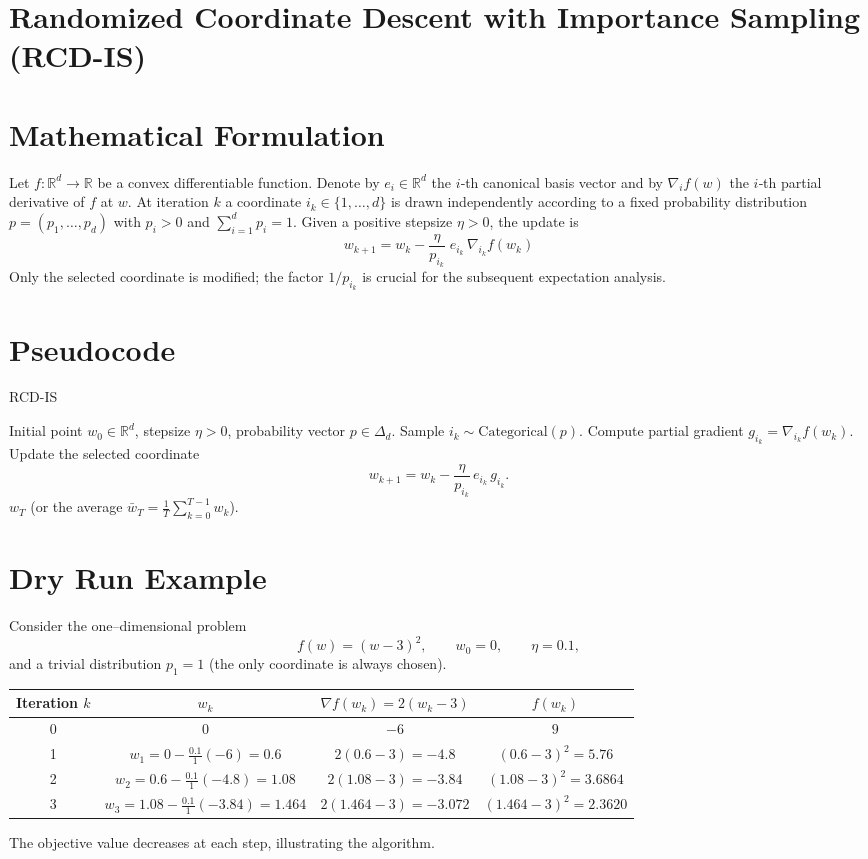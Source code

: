 \documentclass{article}
\newcommand{\R}{\mathbb{R}}
\begin{document}
\section*{Randomized Coordinate Descent with Importance Sampling (RCD-IS)}

\section*{Mathematical Formulation}
Let $f:\R^{d}\rightarrow\R$ be a convex differentiable function.  
Denote by $e_i\in\R^{d}$ the $i$‑th canonical basis vector and by
$\nabla_i f(w)$ the $i$‑th partial derivative of $f$ at $w$.
At iteration $k$ a coordinate $i_k\in\{1,\dots ,d\}$ is drawn
independently according to a fixed probability distribution 
$p=(p_1,\dots ,p_d)$ with $p_i>0$ and $\sum_{i=1}^{d}p_i=1$.
Given a positive stepsize $\eta>0$, the update is
\[
\boxed{
w_{k+1}= w_{k}-\frac{\eta}{p_{i_k}}\; e_{i_k}\,\nabla_{i_k} f(w_k)
}\tag{1}
\]
Only the selected coordinate is modified; the factor $1/p_{i_k}$ is
crucial for the subsequent expectation analysis.

\section*{Pseudocode}
\begin{algorithm}[H]
\caption{RCD-IS}
\begin{algorithmic}[1]
\REQUIRE Initial point $w_0\in\R^{d}$, stepsize $\eta>0$, probability vector $p\in\Delta_{d}$.
    \STATE Sample $i_k\sim\text{Categorical}(p)$.
    \STATE Compute partial gradient $g_{i_k}= \nabla_{i_k}f(w_k)$.
    \STATE Update the selected coordinate
    \[
    w_{k+1}= w_{k}-\frac{\eta}{p_{i_k}}\,e_{i_k}\,g_{i_k}.
    \]
\ENDFOR
\RETURN $w_T$ (or the average $\bar w_T=\frac1T\sum_{k=0}^{T-1}w_k$).
\end{algorithmic}
\end{algorithm}

\section*{Dry Run Example}
Consider the one–dimensional problem 
\[
f(w)=(w-3)^2,\qquad w_0=0,\qquad \eta=0.1,
\]
and a trivial distribution $p_1=1$ (the only coordinate is always chosen).

\begin{center}
\begin{tabular}{c|c|c|c}
Iteration $k$ & $w_k$ & $\nabla f(w_k)=2(w_k-3)$ & $f(w_k)$\\ \hline
0 & $0$ & $-6$ & $9$\\
1 & $w_1=0-\frac{0.1}{1}(-6)=0.6$ & $2(0.6-3)=-4.8$ & $(0.6-3)^2=5.76$\\
2 & $w_2=0.6-\frac{0.1}{1}(-4.8)=1.08$ & $2(1.08-3)=-3.84$ & $(1.08-3)^2=3.6864$\\
3 & $w_3=1.08-\frac{0.1}{1}(-3.84)=1.464$ & $2(1.464-3)=-3.072$ & $(1.464-3)^2=2.3620$
\end{tabular}
\end{center}
The objective value decreases at each step, illustrating the algorithm.
\end{document}
